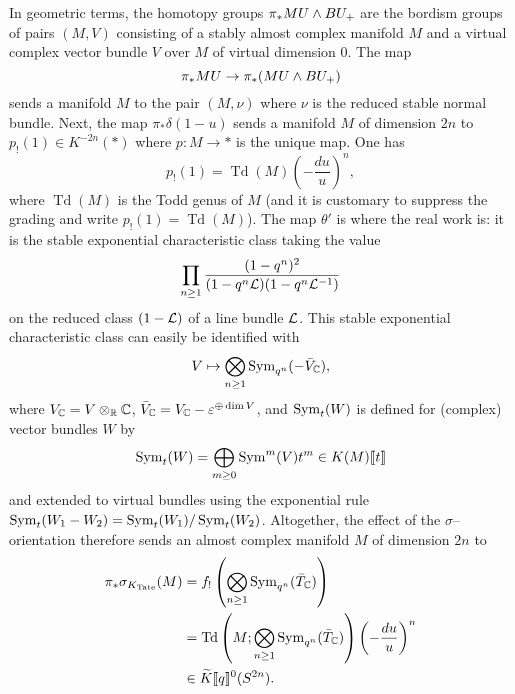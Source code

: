 In geometric terms, the homotopy groups $\pi_* MU \wedge BU_+$ are the bordism groups of pairs $(M, V)$ consisting of a stably almost complex manifold $M$ and a virtual complex vector bundle $V$ over $M$ of virtual dimension $0$.  The map \[\pi_* MU \to \pi_* (MU \wedge BU_+)\] sends a manifold $M$ to the pair $(M, \nu)$ where $\nu$ is the reduced stable normal bundle.  Next, the map $\pi_* \delta(1 - u)$ sends a manifold $M$ of dimension $2n$ to $p_!(1) \in K^{-2n}(*)$ where $p: M \to *$ is the unique map.  One has \[p_!(1) = \operatorname{Td}(M) \left( -\frac{du}{u} \right)^n,\] where $\operatorname{Td}(M)$ is the Todd genus of $M$ (and it is customary to suppress the grading and write $p_!(1) = \operatorname{Td}(M)$).  The map $\theta'$ is where the real work is: it is the stable exponential characteristic class taking the value \[\prod_{n \ge 1} \frac{(1 - q^n)^2}{(1 - q^n \mathcal{L})(1 - q^n \mathcal{L}^{-1})}\] on the reduced class $(1 - \mathcal{L})$ of a line bundle $\mathcal{L}$.  This stable exponential characteristic class can easily be identified with \[V \mapsto \bigotimes_{n \ge 1} \operatorname{Sym}_{q^n}(- \bar V_{\mathbb{C}}),\] where $V_{\mathbb{C}} = V \otimes_{\mathbb R} \mathbb{C}$, $\bar V_{\mathbb{C}} = V_{\mathbb{C}} - \varepsilon^{\oplus \dim V}$, and $\operatorname{Sym}_t(W)$ is defined for (complex) vector bundles $W$ by \[\operatorname{Sym}_t(W) = \bigoplus_{m \ge 0} \operatorname{Sym}^m(V) t^m \in K(M)\llbracket{t}\rrbracket\] and extended to virtual bundles using the exponential rule $\operatorname{Sym}_t(W_1 - W_2) = \operatorname{Sym}_t(W_1) / \operatorname{Sym}_t(W_2)$.  Altogether, the effect of the $\sigma$--orientation therefore sends an almost complex manifold $M$ of dimension $2n$ to
\begin{align*}
\pi_* \sigma_{K_{\mathrm{Tate}}}(M) & = f_! \left( \bigotimes_{n \ge 1} \operatorname{Sym}_{q^n}(\bar T_{\mathbb{C}}) \right) \\
& = \operatorname{Td}\left(M; \bigotimes_{n \ge 1} \operatorname{Sym}_{q^n}(\bar T_{\mathbb{C}}) \right) \left( -\frac{du}{u} \right)^n \\
& \in \widetilde K\llbracket{q}\rrbracket^0(S^{2n}).
\end{align*}

